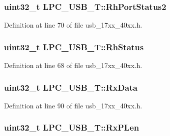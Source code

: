 \subsubsection[{\texorpdfstring{Rh\+Port\+Status2}{RhPortStatus2}}]{ uint32\+\_\+t L\+P\+C\+\_\+\+U\+S\+B\+\_\+\+T\+::\+Rh\+Port\+Status2}\hypertarget{structLPC__USB__T_a8fffb92a812b2bfa223cfdd25f5deeed}{}\label{structLPC__USB__T_a8fffb92a812b2bfa223cfdd25f5deeed}


Definition at line 70 of file usb\+\_\+17xx\+\_\+40xx.\+h.

\subsubsection[{\texorpdfstring{Rh\+Status}{RhStatus}}]{ uint32\+\_\+t L\+P\+C\+\_\+\+U\+S\+B\+\_\+\+T\+::\+Rh\+Status}\hypertarget{structLPC__USB__T_a0ab04d8fe8a16bdaa912af1e8f7ba96b}{}\label{structLPC__USB__T_a0ab04d8fe8a16bdaa912af1e8f7ba96b}


Definition at line 68 of file usb\+\_\+17xx\+\_\+40xx.\+h.

\subsubsection[{\texorpdfstring{Rx\+Data}{RxData}}]{ uint32\+\_\+t L\+P\+C\+\_\+\+U\+S\+B\+\_\+\+T\+::\+Rx\+Data}\hypertarget{structLPC__USB__T_a64b8c24558263ee41642f237019e7cf5}{}\label{structLPC__USB__T_a64b8c24558263ee41642f237019e7cf5}


Definition at line 90 of file usb\+\_\+17xx\+\_\+40xx.\+h.

\subsubsection[{\texorpdfstring{Rx\+P\+Len}{RxPLen}}]{ uint32\+\_\+t L\+P\+C\+\_\+\+U\+S\+B\+\_\+\+T\+::\+Rx\+P\+Len}\hypertarget{structLPC__USB__T_a983d49e56ceaffe3116b3d7422cb6d5c}{}\label{structLPC__USB__T_a983d49e56ceaffe3116b3d7422cb6d5c}


